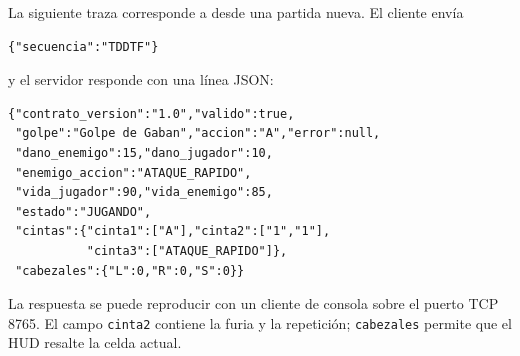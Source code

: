 La siguiente traza corresponde a  desde una partida nueva. El cliente envía
\begin{verbatim}
{"secuencia":"TDDTF"}
\end{verbatim}
y el servidor responde con una línea JSON:
\begin{verbatim}
{"contrato_version":"1.0","valido":true,
 "golpe":"Golpe de Gaban","accion":"A","error":null,
 "dano_enemigo":15,"dano_jugador":10,
 "enemigo_accion":"ATAQUE_RAPIDO",
 "vida_jugador":90,"vida_enemigo":85,
 "estado":"JUGANDO",
 "cintas":{"cinta1":["A"],"cinta2":["1","1"],
           "cinta3":["ATAQUE_RAPIDO"]},
 "cabezales":{"L":0,"R":0,"S":0}}
\end{verbatim}
La respuesta se puede reproducir con un cliente de consola sobre el puerto TCP 8765. El campo \texttt{cinta2} contiene la furia y la repetición; \texttt{cabezales} permite que el HUD resalte la celda actual.
